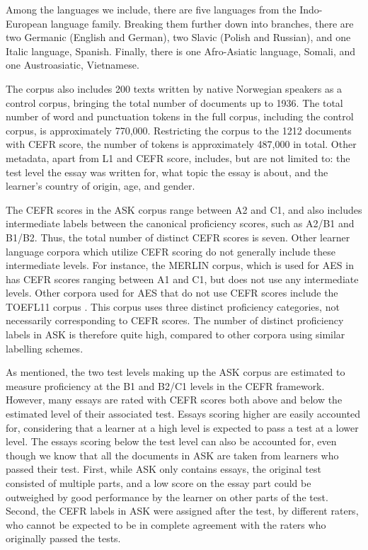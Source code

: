 Among the languages we include, there are five languages from the
Indo-European language family. Breaking them further down into branches,
there are two Germanic (English and German), two Slavic (Polish and Russian),
and one Italic language, Spanish. Finally, there is one Afro-Asiatic
language, Somali, and one Austroasiatic, Vietnamese.

The corpus also includes 200 texts written by native Norwegian speakers as a
control corpus, bringing the total number of documents up to 1936. The total
number of word and punctuation tokens in the full corpus, including the
control corpus, is approximately 770,000. Restricting the corpus to the 1212
documents with \ac{CEFR} score, the number of tokens is approximately 487,000
in total. Other metadata, apart from L1 and CEFR score, includes, but are not
limited to: the test level the essay was written for, what topic the essay
is about, and the learner's country of origin, age, and gender.

The CEFR scores in the ASK corpus range between A2 and C1, and also includes
intermediate labels between the canonical proficiency scores, such as A2/B1
and B1/B2. Thus, the total number of distinct CEFR scores is seven. Other
learner language corpora which utilize CEFR scoring do not generally include
these intermediate levels. For instance, the MERLIN corpus, which is used for
\ac{AES} in \autocite{vajjala18universalCEFR,hancke2013} has CEFR scores
ranging between A1 and C1, but does not use any intermediate levels. Other
corpora used for \ac{AES} that do not use CEFR scores include the TOEFL11
corpus \autocite{blanchard13}. This corpus uses three distinct proficiency
categories, not necessarily corresponding to CEFR scores. The number of
distinct proficiency labels in ASK is therefore quite high, compared to other
corpora using similar labelling schemes.

As mentioned, the two test levels making up the ASK corpus are estimated to
measure proficiency at the B1 and B2/C1 levels in the CEFR framework.
However, many essays are rated with CEFR scores both above and below the
estimated level of their associated test. Essays scoring higher are easily
accounted for, considering that a learner at a high level is expected to pass
a test at a lower level. The essays scoring below the test level can also be
accounted for, even though we know that all the documents in ASK are taken
from learners who passed their test. First, while ASK only contains essays,
the original test consisted of multiple parts, and a low score on the essay
part could be outweighed by good performance by the learner on other parts of
the test. Second, the CEFR labels in ASK were assigned after the test, by
different raters, who cannot be expected to be in complete agreement with the
raters who originally passed the tests.

